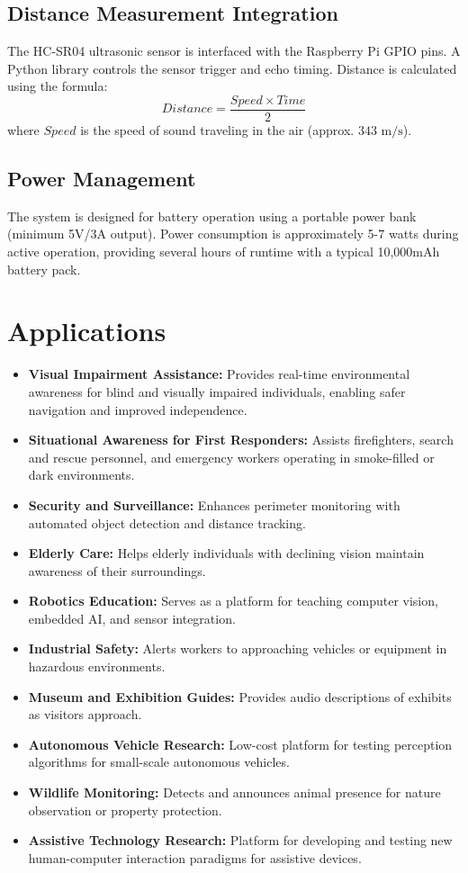 \documentclass[conference]{IEEEtran}
\begin{document}
\subsection{Distance Measurement Integration}
The HC-SR04 ultrasonic sensor is interfaced with the Raspberry Pi GPIO pins. A Python library controls the sensor trigger and echo timing. Distance is calculated using the formula:
\begin{equation}
    Distance = \frac{Speed \times Time}{2}
\end{equation}
where $Speed$ is the speed of sound traveling in the air (approx. $343 \text{ m/s}$).

\subsection{Power Management}
The system is designed for battery operation using a portable power bank (minimum 5V/3A output). Power consumption is approximately 5-7 watts during active operation, providing several hours of runtime with a typical 10,000mAh battery pack.

\section{Applications}
\begin{itemize}
    \item \textbf{Visual Impairment Assistance:} Provides real-time environmental awareness for blind and visually impaired individuals, enabling safer navigation and improved independence.
    \item \textbf{Situational Awareness for First Responders:} Assists firefighters, search and rescue personnel, and emergency workers operating in smoke-filled or dark environments.
    \item \textbf{Security and Surveillance:} Enhances perimeter monitoring with automated object detection and distance tracking.
    \item \textbf{Elderly Care:} Helps elderly individuals with declining vision maintain awareness of their surroundings.
    \item \textbf{Robotics Education:} Serves as a platform for teaching computer vision, embedded AI, and sensor integration.
    \item \textbf{Industrial Safety:} Alerts workers to approaching vehicles or equipment in hazardous environments.
    \item \textbf{Museum and Exhibition Guides:} Provides audio descriptions of exhibits as visitors approach.
    \item \textbf{Autonomous Vehicle Research:} Low-cost platform for testing perception algorithms for small-scale autonomous vehicles.
    \item \textbf{Wildlife Monitoring:} Detects and announces animal presence for nature observation or property protection.
    \item \textbf{Assistive Technology Research:} Platform for developing and testing new human-computer interaction paradigms for assistive devices.
\end{itemize}
\end{document}
